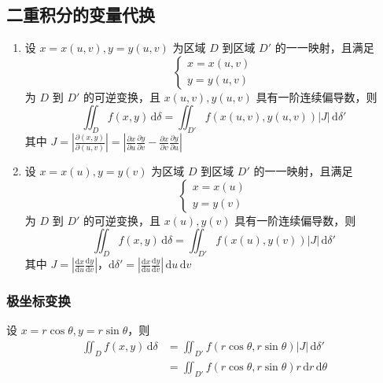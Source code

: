 \subsection{二重积分的变量代换}

\begin{enumerate}
    \item 设 $x=x(u,v),y=y(u,v)$ 为区域 $D$ 到区域 $D'$ 的一一映射，且满足
          \[
              \begin{cases}
                  x=x(u,v) \\
                  y=y(u,v)
              \end{cases}
          \]
          为 $D$ 到 $D'$ 的可逆变换，且 $x(u,v),y(u,v)$ 具有一阶连续偏导数，则
          \[
              \iint_{D} f(x,y) \, \mathrm{d}\delta = \iint_{D'} f(x(u,v),y(u,v)) \left| J \right| \, \mathrm{d}\delta'
          \]
          其中 $J = \left| \frac{\partial(x,y)}{\partial(u,v)} \right| = \left| \frac{\partial x}{\partial u} \frac{\partial y}{\partial v} - \frac{\partial x}{\partial v} \frac{\partial y}{\partial u} \right|$
    \item 设 $x=x(u),y=y(v)$ 为区域 $D$ 到区域 $D'$ 的一一映射，且满足
          \[
              \begin{cases}
                  x=x(u) \\
                  y=y(v)
              \end{cases}
          \]
          为 $D$ 到 $D'$ 的可逆变换，且 $x(u),y(v)$ 具有一阶连续偏导数，则
          \[
              \iint_{D} f(x,y) \, \mathrm{d}\delta = \iint_{D'} f(x(u),y(v)) \left| J \right| \, \mathrm{d}\delta'
          \]
          其中 $J = \left| \frac{\mathrm{d}x}{\mathrm{d}u} \frac{\mathrm{d}y}{\mathrm{d}v} \right|$，$\mathrm{d}\delta' = \left| \frac{\mathrm{d}x}{\mathrm{d}u} \frac{\mathrm{d}y}{\mathrm{d}v} \right| \, \mathrm{d}u \, \mathrm{d}v$
\end{enumerate}

\subsubsection{极坐标变换}

设 $x=r\cos\theta,y=r\sin\theta$，则
\[
    \begin{aligned}
        \iint_{D} f(x,y) \, \mathrm{d}\delta & = \iint_{D'} f(r\cos\theta,r\sin\theta) \left| J \right| \, \mathrm{d}\delta' \\
                                             & = \iint_{D'} f(r\cos\theta,r\sin\theta) r \, \mathrm{d}r \, \mathrm{d}\theta
    \end{aligned}
\]
